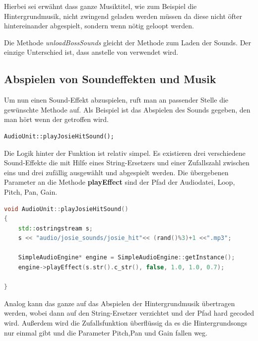 Hierbei sei erwähnt dass ganze Musiktitel, wie zum Beispiel die Hintergrundmusik, nicht zwingend geladen werden müssen da diese nicht öfter hintereinander abgespielt, sondern wenn nötig geloopt werden. 

Die Methode \textit{unloadBossSounds} gleicht der Methode zum Laden der Sounds. Der einzige Unterschied ist, dass  anstelle von  verwendet wird.

\subsection{Abspielen von Soundeffekten und Musik} 
Um nun einen Sound-Effekt abzuspielen, ruft man an passender Stelle die gewünschte Methode auf. Als Beispiel ist das Abspielen des Sounds gegeben, den man hört wenn der  getroffen wird.

\begin{lstlisting}[style=singleline]
AudioUnit::playJosieHitSound();
\end{lstlisting}

Die Logik hinter der Funktion ist relativ simpel. Es existieren drei verschiedene Sound-Effekte die mit Hilfe eines String-Ersetzers und einer Zufallszahl zwischen eins und drei zufällig ausgewählt und abgespielt werden. Die übergebenen Parameter an die Methode \textbf{playEffect} sind der Pfad der Audiodatei, Loop, Pitch, Pan, Gain.

\begin{lstlisting}[label=lst:playJosieShootSound,
				   language=C++,
				   firstnumber=30,
				   caption=BossLevel Shoot Sound abspielen ( AudioUnit.cpp )]
void AudioUnit::playJosieHitSound()
{
	std::ostringstream s;
	s << "audio/josie_sounds/josie_hit"<< (rand()%3)+1 <<".mp3";

	SimpleAudioEngine* engine = SimpleAudioEngine::getInstance();
	engine->playEffect(s.str().c_str(), false, 1.0, 1.0, 0.7);
	
}
\end{lstlisting}

Analog kann das ganze auf das Abspielen der Hintergrundmusik übertragen werden, wobei dann auf den String-Ersetzer verzichtet und der Pfad hard gecoded wird. Außerdem wird die Zufallsfunktion überflüssig da es die Hintergrundsongs nur einmal gibt und die Parameter Pitch,Pan und Gain fallen weg.



\label{sec:4_Kollisionsabfrage}

